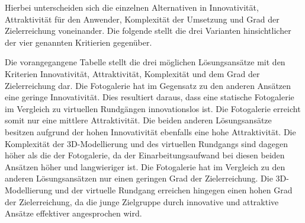 Hierbei unterscheiden sich die einzelnen Alternativen in Innovativität,
Attraktivität für den Anwender, Komplexität der Umsetzung und Grad der Zielerreichung voneinander.
Die folgende  stellt die drei Varianten
hinsichtlicher der vier genannten Kritierien gegenüber.

% 


Die vorangegangene Tabelle stellt die drei möglichen Lösungsansätze mit den Kriterien 
Innovativität, Attraktivität, Komplexität und dem Grad der Zielerreichung dar. Die 
Fotogalerie hat im Gegensatz zu den anderen Ansätzen eine geringe Innovativität. Dies 
resultiert daraus, dass eine statische Fotogalerie im Vergleich zu virtuellen Rundgängen 
innovationslos ist. Die Fotogalerie erreicht somit nur eine mittlere Attraktivität. Die 
beiden anderen Lösungsansätze besitzen aufgrund der hohen Innovativität ebenfalls eine hohe 
Attraktivität. Die Komplexität der 3D-Modellierung und des virtuellen Rundgangs sind dagegen 
höher als die der Fotogalerie, da der Einarbeitungsaufwand bei diesen beiden Ansätzen höher 
und langwieriger ist. Die Fotogalerie hat im Vergleich zu den anderen Lösungsansätzen nur 
einen geringen Grad der Zielerreichung. Die 3D-Modellierung und der virtuelle Rundgang erreichen 
hingegen einen hohen Grad der Zielerreichung, da die junge Zielgruppe durch innovative und attraktive Ansätze
effektiver angesprochen wird.



